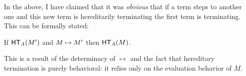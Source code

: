 \documentclass{article}
\begin{document}
In the above, I have claimed that it was \emph{obvious} that if a term
steps to another one and this new term is hereditarily terminating
the first term is terminating. This can be formally stated:
\begin{lemma}
  If $\mathsf{HT}_{A}(M')$ and $M \mapsto M'$ then $\mathsf{HT}_{A}(M)$.
\end{lemma}
This is a result of the determinacy of $\mapsto$ and the fact that
hereditary termination is purely behavioral: it relies only on the
evaluation behavior of $M$.



\end{document}
